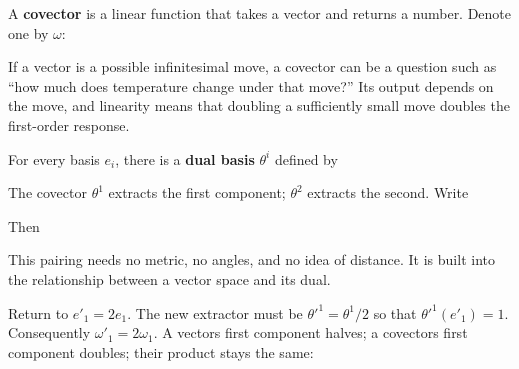 \documentclass[
  11pt,
  letterpaper,
  oneside,
  openany]{scrbook}
\begin{document}
A \textbf{covector} is a linear function that takes a vector and returns
a number. Denote one by \(\omega\):

\begin{center}
\begingroup
{}
\ifdim\wd\grmathbox>\linewidth
\resizebox{\linewidth}{!}{\usebox{\grmathbox}}
\else\usebox{\grmathbox}\fi
\endgroup
\end{center}

If a vector is a possible infinitesimal move, a covector can be a
question such as ``how much does temperature change under that move?''
Its output depends on the move, and linearity means that doubling a
sufficiently small move doubles the first-order response.

For every basis \(e_i\), there is a \textbf{dual basis} \(\theta^i\)
defined by

\begin{center}
\begingroup
{}
\ifdim\wd\grmathbox>\linewidth
\resizebox{\linewidth}{!}{\usebox{\grmathbox}}
\else\usebox{\grmathbox}\fi
\endgroup
\end{center}

The covector \(\theta^1\) extracts the first component; \(\theta^2\)
extracts the second. Write

\begin{center}
\begingroup
{}
\ifdim\wd\grmathbox>\linewidth
\resizebox{\linewidth}{!}{\usebox{\grmathbox}}
\else\usebox{\grmathbox}\fi
\endgroup
\end{center}

Then

\begin{center}
\begingroup
{}
\ifdim\wd\grmathbox>\linewidth
\resizebox{\linewidth}{!}{\usebox{\grmathbox}}
\else\usebox{\grmathbox}\fi
\endgroup
\end{center}

This pairing needs no metric, no angles, and no idea of distance. It is
built into the relationship between a vector space and its dual.

Return to \(e'_1=2e_1\). The new extractor must be
\(\theta'^1=\theta^1/2\) so that \(\theta'^1(e'_1)=1\). Consequently
\(\omega'_1=2\omega_1\). A vector\textquotesingle s first component
halves; a covector\textquotesingle s first component doubles; their
product stays the same:
\end{document}
